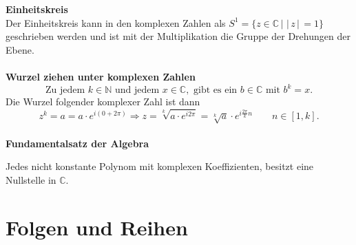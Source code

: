 \documentclass[a4paper,12pt]{article}
\begin{document}
\textbf{Einheitskreis}\\
Der Einheitskreis kann in den komplexen Zahlen als $S^{1}=\{z \in \mathbb{C}\,|\, \,|\, z\,|\, =1\}$ geschrieben werden und ist mit der Multiplikation die Gruppe der Drehungen der Ebene.
\\\hfill\\\textbf{Wurzel ziehen unter komplexen Zahlen}
\[ 
\text{Zu jedem }k \in \mathbb{N}\text{ und jedem }x \in \mathbb{C},\text{ gibt es ein }b \in \mathbb{C}\text{ mit }b^{k}=x
.\] 
Die Wurzel folgender komplexer Zahl ist dann
\[ 
        z^k=a=a\cdot e^{i\left(0+2\pi\right)}\Rightarrow z=\sqrt[k]{a\cdot e^{i2\pi}}=\sqrt[k]{a}\cdot e^{i\tfrac{2\pi}{k}n}\qquad n  \in [1,k]
.\] 
\hfill\\\textbf{Fundamentalsatz der Algebra}
\begin{center}
        Jedes nicht konstante Polynom mit komplexen Koeffizienten, besitzt eine Nullstelle in $\mathbb{C}$.
\end{center}

\section{Folgen und Reihen}
\end{document}
